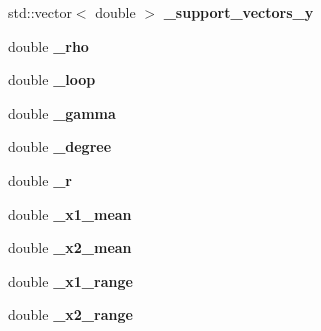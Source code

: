 \begin{DoxyCompactItemize}
\item 
\hypertarget{classubana_1_1MuonCandidateFinder_a26ff1388fd925432f3b3ddcef36866d5}{std\-::vector$<$ double $>$ {\bfseries \-\_\-support\-\_\-vectors\-\_\-y}}\label{classubana_1_1MuonCandidateFinder_a26ff1388fd925432f3b3ddcef36866d5}

\item 
\hypertarget{classubana_1_1MuonCandidateFinder_ac8585a19ce1861eb280fd0b7654c0fa3}{double {\bfseries \-\_\-rho}}\label{classubana_1_1MuonCandidateFinder_ac8585a19ce1861eb280fd0b7654c0fa3}

\item 
\hypertarget{classubana_1_1MuonCandidateFinder_afe47e105b7c1de947c6c550e5efe6d28}{double {\bfseries \-\_\-loop}}\label{classubana_1_1MuonCandidateFinder_afe47e105b7c1de947c6c550e5efe6d28}

\item 
\hypertarget{classubana_1_1MuonCandidateFinder_ad0de746d1b274f4adbad51371a673a86}{double {\bfseries \-\_\-gamma}}\label{classubana_1_1MuonCandidateFinder_ad0de746d1b274f4adbad51371a673a86}

\item 
\hypertarget{classubana_1_1MuonCandidateFinder_aa428d088ef4709d0ed7452e5841c7c75}{double {\bfseries \-\_\-degree}}\label{classubana_1_1MuonCandidateFinder_aa428d088ef4709d0ed7452e5841c7c75}

\item 
\hypertarget{classubana_1_1MuonCandidateFinder_a97841e76770881e6537500b772a09a4a}{double {\bfseries \-\_\-r}}\label{classubana_1_1MuonCandidateFinder_a97841e76770881e6537500b772a09a4a}

\item 
\hypertarget{classubana_1_1MuonCandidateFinder_a659f7e59f05d5247e8c0f1468054d73c}{double {\bfseries \-\_\-x1\-\_\-mean}}\label{classubana_1_1MuonCandidateFinder_a659f7e59f05d5247e8c0f1468054d73c}

\item 
\hypertarget{classubana_1_1MuonCandidateFinder_a5da0362ad15013f47fc304b36142f992}{double {\bfseries \-\_\-x2\-\_\-mean}}\label{classubana_1_1MuonCandidateFinder_a5da0362ad15013f47fc304b36142f992}

\item 
\hypertarget{classubana_1_1MuonCandidateFinder_aaa42e26f99367921ead9841a03875567}{double {\bfseries \-\_\-x1\-\_\-range}}\label{classubana_1_1MuonCandidateFinder_aaa42e26f99367921ead9841a03875567}

\item 
\hypertarget{classubana_1_1MuonCandidateFinder_a7b4f49b181b746f2f28ed41a793a38e6}{double {\bfseries \-\_\-x2\-\_\-range}}\label{classubana_1_1MuonCandidateFinder_a7b4f49b181b746f2f28ed41a793a38e6}

\end{DoxyCompactItemize}



